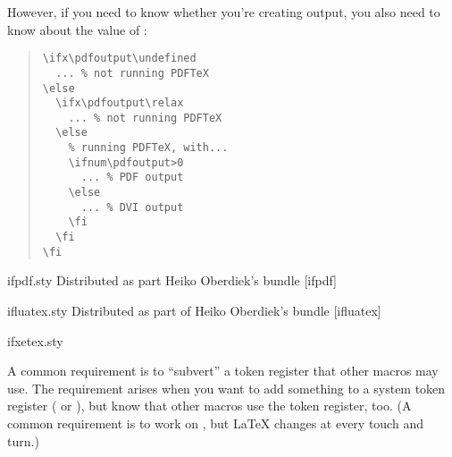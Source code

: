 However, if you need to know whether you're creating 
output, you also need to know about the value of :
\begin{quote}
\begin{verbatim}
\ifx\pdfoutput\undefined
  ... % not running PDFTeX
\else
  \ifx\pdfoutput\relax
    ... % not running PDFTeX
  \else
    % running PDFTeX, with...
    \ifnum\pdfoutput>0
      ... % PDF output
    \else
      ... % DVI output
    \fi
  \fi
\fi
\end{verbatim}
\end{quote}
\begin{ctanrefs}
\item[ifpdf.sty]Distributed as part Heiko Oberdiek's bundle
  [ifpdf]
\item[ifluatex.sty]Distributed as part of Heiko Oberdiek's bundle
  [ifluatex]
\item[ifxetex.sty]
\end{ctanrefs}


A common requirement is to ``subvert'' a token register that other
macros may use.  The requirement arises when you want to add something
to a system token register ( or ), but know
that other macros use the token register, too.  (A common requirement
is to work on , but \LaTeX{} changes  at
every touch and turn.)


